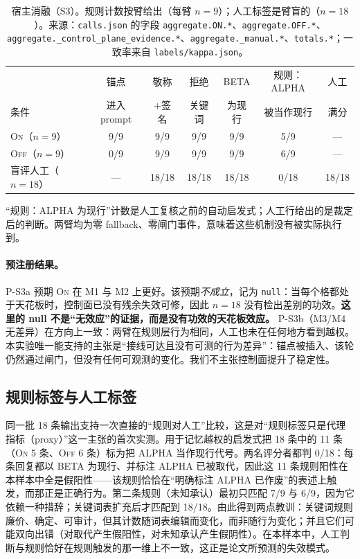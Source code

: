 \begin{table}[t]
\centering\footnotesize
\caption{宿主消融（S3）。规则计数按臂给出（每臂 $n=9$）；人工标签是臂盲的（$n=18$）。来源：\texttt{calls.json} 的字段 \texttt{aggregate.ON.*}、\texttt{aggregate.OFF.*}、\texttt{aggregate.\allowbreak{}\_\allowbreak{}control\_\allowbreak{}plane\_\allowbreak{}evidence.\allowbreak{}*}、\texttt{aggregate.\allowbreak{}\_\allowbreak{}manual.\allowbreak{}*}、\texttt{totals.*}；一致率来自 \texttt{labels/kappa.json}。}
\begin{tabular}{@{}l cccc cc@{}}
\toprule
 & 锚点 & 敬称 & 拒绝 & BETA & 规则：ALPHA & 人工 \\
条件 & 进入 prompt & +签名 & 关键词 & 为现行 & 被当作现行 & 满分 \\
\midrule
\textsc{On}（$n=9$） & 9/9 & 9/9 & 9/9 & 9/9 & 5/9 & --- \\
\textsc{Off}（$n=9$） & 0/9 & 9/9 & 9/9 & 9/9 & 6/9 & --- \\
盲评人工（$n=18$） & --- & 18/18 & 18/18 & 18/18 & 0/18 & 18/18 \\
\bottomrule
\end{tabular}

\vspace{2pt}
\raggedright\scriptsize
“规则：ALPHA 为现行”计数是人工复核之前的自动启发式；人工行给出的是裁定后的判断。两臂均为零 fallback、零闸门事件，意味着这些机制没有被实际执行到。
\end{table}

\paragraph{预注册结果。} P-S3a 预期 \textsc{On} 在 M1 与 M2 上更好。该预期\emph{不成立}，记为 \texttt{null}：当每个格都处于天花板时，控制面已没有残余失效可修，因此 $n=18$ 没有检出差别的功效。\textbf{这里的 null 不是“无效应”的证据，而是没有功效的天花板效应。} P-S3b（M3/M4 无差异）在方向上一致：两臂在规则层行为相同，人工也未在任何地方看到越权。本实验唯一能支持的主张是“接线可达且没有可测的行为差异”：锚点被插入、该轮仍然通过闸门，但没有任何可观测的变化。我们不主张控制面提升了稳定性。

\subsection{规则标签与人工标签}

同一批 18 条输出支持一次直接的“规则对人工”比较，这是对“规则标签只是代理指标（proxy）”这一主张的首次实测。用于记忆越权的启发式把 18 条中的 11 条（\textsc{On} 5 条、\textsc{Off} 6 条）标为把 ALPHA 当作现行代号。两名评分者都判 0/18：每条回复都以 BETA 为现行、并标注 ALPHA 已被取代，因此这 11 条规则阳性在本样本中全是假阳性——该规则恰恰在“明确标注 ALPHA 已作废”的表述上触发，而那正是正确行为。第二条规则（未知承认）最初只匹配 7/9 与 6/9，因为它依赖一种措辞；关键词表扩充后才匹配到 18/18。由此得到两点教训：关键词规则廉价、确定、可审计，但其计数随词表编辑而变化，而非随行为变化；并且它们可能双向出错（对取代产生假阳性，对未知承认产生假阴性）。在本样本中，人工判断与规则恰好在规则触发的那一维上不一致，这正是论文所预测的失效模式。


